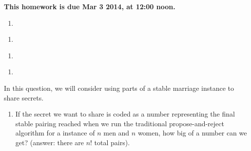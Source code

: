 \documentclass[]{article}
\newif\ifsolutions
\renewcommand{\answer}[1]{{\color{mydarkblue}\textbf{}#1}}
\begin{document}
\maketitle
{}
\vspace{0.5em}
{\Large{\textbf{This homework is due Mar 3 2014, at 12:00 noon.}}}

\begin{qunlist}
  
\begin{enumerate}
\qpart
\item
\ifsolutions{ \answer 
{
}}\fi


\ifsolutions{ \answer {
\textbf{Motivation}
}}\fi
\end{enumerate}

  
\begin{enumerate}
\qpart
\item
\ifsolutions{ \answer 
{
}}\fi


\ifsolutions{ \answer {
\textbf{Motivation} 
}}\fi 
\end{enumerate}



\begin{enumerate}
\qpart
\item

\ifsolutions{ \answer 
{
}}\fi


\ifsolutions{ \answer {
\textbf{Motivation}
}}\fi
    
\end{enumerate}


\begin{enumerate}
\qpart
\item 

\end{enumerate}


\qpart


\qpart




In this question, we will consider using parts of a stable marriage instance to share secrets. 

\begin{enumerate}
\qpart
\item  If the secret we want to share is coded as a number representing the final stable pairing reached when we run the traditional propose-and-reject algorithm for a instance of $n$ men and $n$ women, how big of a number can we get? (answer: there are $n!$ total pairs).


\end{enumerate}
\end{qunlist}
\end{document}
